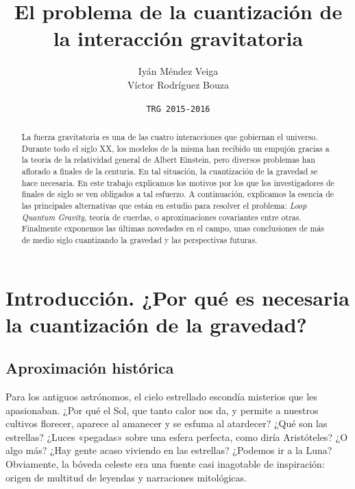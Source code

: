\documentclass[11pt,a4paper,titlepage]{article}
\title{\Huge\textbf{El problema de la cuantización de la interacción gravitatoria}}
\author{\textsf{Iyán Méndez Veiga}\\ \textsf{Víctor Rodríguez Bouza}}
\date{\texttt{TRG 2015-2016}}
\begin{document}
\begin{titlepage}

\end{titlepage}


\newpage
\tableofcontents
\newpage


\begin{abstract}
La fuerza gravitatoria es una de las cuatro interacciones que gobiernan el universo. Durante todo el siglo XX, los modelos de la misma han recibido un empujón gracias a la teoría de la relatividad general de Albert Einstein, pero diversos problemas han aflorado a finales de la centuria. En tal situación, la cuantización de la gravedad se hace necesaria. En este trabajo explicamos los motivos por los que los investigadores de finales de siglo se ven obligados a tal esfuerzo. A continuación, explicamos la esencia de las principales alternativas que están en estudio para resolver el problema: \textit{Loop Quantum Gravity}, teoría de cuerdas, o aproximaciones covariantes entre otras. Finalmente exponemos las últimas novedades en el campo, unas conclusiones de más de medio siglo cuantizando la gravedad y las perspectivas futuras.
\end{abstract}


\section{Introducción. ¿Por qué es necesaria la cuantización de la gravedad?} %

\subsection{Aproximación histórica}

Para los antiguos astrónomos, el cielo estrellado escondía misterios que les apasionaban. ¿Por qué el Sol, que tanto calor nos da, y permite a nuestros cultivos florecer, aparece al amanecer y se esfuma al atardecer? ¿Qué son las estrellas? ¿Luces «pegadas» sobre una esfera perfecta, como diría Aristóteles? ¿O algo más? ¿Hay gente acaso viviendo en las estrellas? ¿Podemos ir a la Luna? Obviamente, la bóveda celeste era una fuente casi inagotable de inspiración: origen de multitud de leyendas y narraciones mitológicas.
\end{document}
